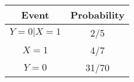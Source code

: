 \begin{center}
\begin{tabular}{|c|c|}
\hline
Event	&Probability\\
\hline
$Y = 0|X = 1$	& 2/5 \\
\hline
$X = 1$	& 4/7 \\
\hline
$Y = 0$	& 31/70 \\
\hline
\end{tabular}
\end{center}
